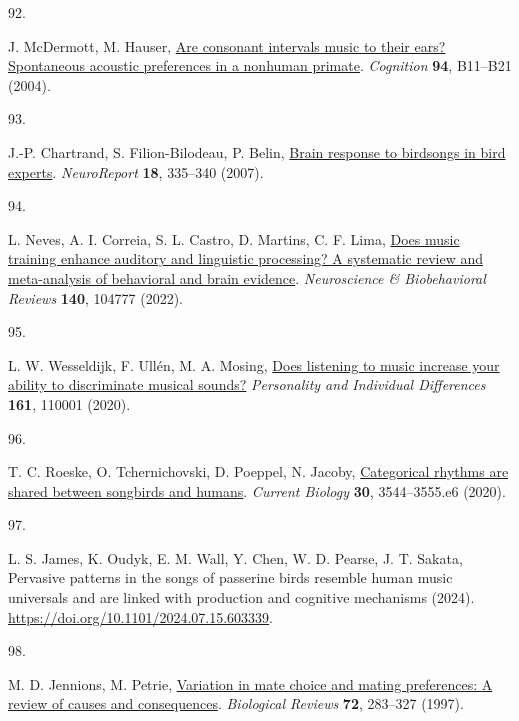 \documentclass[
]{article}
\newlength{\cslhangindent}
\newlength{\csllabelwidth}
\newenvironment{CSLReferences}[2] %
 {\begin{list}{}{%
  \setlength{\itemindent}{0pt}
  \setlength{\leftmargin}{0pt}
  \setlength{\parsep}{0pt}
  \ifodd #1
   \setlength{\leftmargin}{\cslhangindent}
   \setlength{\itemindent}{-1\cslhangindent}
  \fi
  \setlength{\itemsep}{#2\baselineskip}}}
 {\end{list}}
\newcommand{\CSLLeftMargin}[1]{\parbox[t]{\csllabelwidth}{\strut#1\strut}}
\newcommand{\CSLRightInline}[1]{\parbox[t]{\linewidth - \csllabelwidth}{\strut#1\strut}}
\begin{document}
\begin{CSLReferences}{0}{0}
\CSLLeftMargin{92. }%
\CSLRightInline{J. McDermott, M. Hauser,
\href{https://doi.org/10.1016/j.cognition.2004.04.004}{Are consonant
intervals music to their ears? {Spontaneous} acoustic preferences in a
nonhuman primate}. \emph{Cognition} \textbf{94}, B11--B21 (2004).}

\CSLLeftMargin{93. }%
\CSLRightInline{J.-P. Chartrand, S. Filion-Bilodeau, P. Belin,
\href{https://doi.org/10.1097/WNR.0b013e328013cea9}{Brain response to
birdsongs in bird experts}. \emph{NeuroReport} \textbf{18}, 335--340
(2007).}

\CSLLeftMargin{94. }%
\CSLRightInline{L. Neves, A. I. Correia, S. L. Castro, D. Martins, C. F.
Lima, \href{https://doi.org/10.1016/j.neubiorev.2022.104777}{Does music
training enhance auditory and linguistic processing? {A} systematic
review and meta-analysis of behavioral and brain evidence}.
\emph{Neuroscience \& Biobehavioral Reviews} \textbf{140}, 104777
(2022).}

\CSLLeftMargin{95. }%
\CSLRightInline{L. W. Wesseldijk, F. Ullén, M. A. Mosing,
\href{https://doi.org/10.1016/j.paid.2020.110001}{Does listening to
music increase your ability to discriminate musical sounds?}
\emph{Personality and Individual Differences} \textbf{161}, 110001
(2020).}

\CSLLeftMargin{96. }%
\CSLRightInline{T. C. Roeske, O. Tchernichovski, D. Poeppel, N. Jacoby,
\href{https://doi.org/10.1016/j.cub.2020.06.072}{Categorical rhythms are
shared between songbirds and humans}. \emph{Current Biology}
\textbf{30}, 3544--3555.e6 (2020).}

\CSLLeftMargin{97. }%
\CSLRightInline{L. S. James, K. Oudyk, E. M. Wall, Y. Chen, W. D.
Pearse, J. T. Sakata, Pervasive patterns in the songs of passerine birds
resemble human music universals and are linked with production and
cognitive mechanisms (2024).
\url{https://doi.org/10.1101/2024.07.15.603339}.}

\CSLLeftMargin{98. }%
\CSLRightInline{M. D. Jennions, M. Petrie,
\href{https://doi.org/10.1111/j.1469-185X.1997.tb00015.x}{Variation in
mate choice and mating preferences: {A} review of causes and
consequences}. \emph{Biological Reviews} \textbf{72}, 283--327 (1997).}


\end{CSLReferences}
\end{document}
